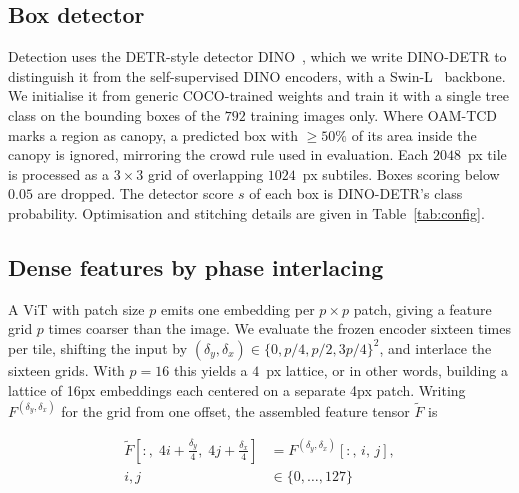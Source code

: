 \documentclass[remotesensing,article,submit,moreauthors]{Definitions/mdpi}
\begin{document}
\subsection{Box detector}
\label{sec:detector}

Detection uses the DETR-style detector DINO~\cite{dinodetr}, which we write DINO-DETR to distinguish it from the self-supervised DINO encoders, with a Swin-L~\cite{swin} backbone. We initialise it from generic COCO-trained weights and train it with a single tree class on the bounding boxes of the $792$ training images only. Where OAM-TCD marks a region as canopy, a predicted box with $\geq 50\%$ of its area inside the canopy is ignored, mirroring the crowd rule used in evaluation. Each $2048$~px tile is processed as a $3 \times 3$ grid of overlapping $1024$~px subtiles. Boxes scoring below $0.05$ are dropped. The detector score $s$ of each box is DINO-DETR's class probability. Optimisation and stitching details are given in Table~\ref{tab:config}.

\subsection{Dense features by phase interlacing}
\label{sec:features}

A ViT with patch size $p$ emits one embedding per $p \times p$ patch, giving a feature grid $p$ times coarser than the image. We evaluate the frozen encoder sixteen times per tile, shifting the input by $(\delta_y, \delta_x) \in \{0, p/4, p/2, 3p/4\}^2$, and interlace the sixteen grids. With $p = 16$ this yields a $4$~px lattice, or in other words, building a lattice of 16px embeddings each centered on a separate 4px patch. Writing $F^{(\delta_y,\delta_x)}$ for the grid from one offset, the assembled feature tensor $\widetilde F$ is

\begin{equation}
\begin{split}
\widetilde F\!\left[:,\; 4i + \tfrac{\delta_y}{4},\; 4j + \tfrac{\delta_x}{4}\right] &= F^{(\delta_y,\delta_x)}[:,\, i,\, j], \\
i, j &\in \{0, \dots, 127\}
\end{split}
\label{eq:interlace}
\end{equation}
\end{document}
